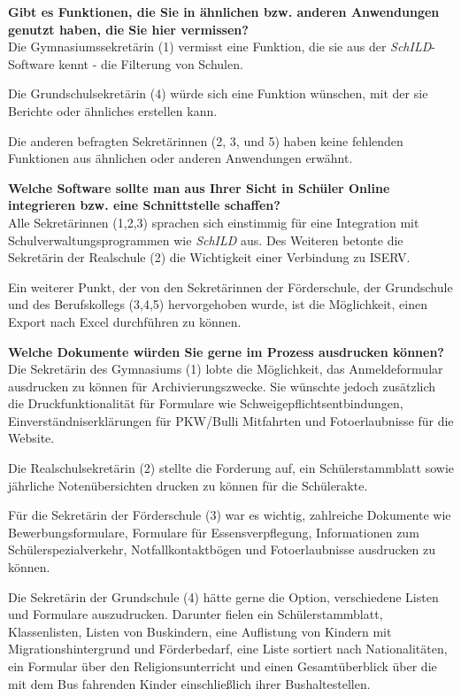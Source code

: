 \textbf{Gibt es Funktionen, die Sie in ähnlichen bzw. anderen Anwendungen genutzt haben, die Sie hier vermissen?}\\
Die Gymnasiumssekretärin (1) vermisst eine Funktion, die sie aus der \textit{SchILD}-Software kennt - die Filterung von Schulen.

Die Grundschulsekretärin (4) würde sich eine Funktion wünschen, mit der sie Berichte oder ähnliches erstellen kann.

Die anderen befragten Sekretärinnen (2, 3, und 5) haben keine fehlenden Funktionen aus ähnlichen oder anderen Anwendungen erwähnt.

\textbf{Welche Software sollte man aus Ihrer Sicht in Schüler Online integrieren bzw. eine Schnittstelle schaffen?}\\
Alle Sekretärinnen (1,2,3) sprachen sich einstimmig für eine Integration mit Schulverwaltungsprogrammen wie \textit{SchILD} aus. Des Weiteren betonte die Sekretärin der Realschule (2) die Wichtigkeit einer Verbindung zu ISERV.

Ein weiterer Punkt, der von den Sekretärinnen der Förderschule, der Grundschule und des Berufskollegs (3,4,5) hervorgehoben wurde, ist die Möglichkeit, einen Export nach Excel durchführen zu können.

\textbf{Welche Dokumente würden Sie gerne im Prozess ausdrucken können?}\\
Die Sekretärin des Gymnasiums (1) lobte die Möglichkeit, das Anmeldeformular ausdrucken zu können für Archivierungszwecke. Sie wünschte jedoch zusätzlich die Druckfunktionalität für Formulare wie Schweigepflichtsentbindungen, Einverständniserklärungen für PKW/Bulli Mitfahrten und Fotoerlaubnisse für die Website.

Die Realschulsekretärin (2) stellte die Forderung auf, ein Schülerstammblatt sowie jährliche Notenübersichten drucken zu können für die Schülerakte.

Für die Sekretärin der Förderschule (3) war es wichtig, zahlreiche Dokumente wie Bewerbungsformulare, Formulare für Essensverpflegung, Informationen zum Schülerspezialverkehr, Notfallkontaktbögen und Fotoerlaubnisse ausdrucken zu können.

Die Sekretärin der Grundschule (4) hätte gerne die Option, verschiedene Listen und Formulare auszudrucken. Darunter fielen ein Schülerstammblatt, Klassenlisten, Listen von Buskindern, eine Auflistung von Kindern mit Migrationshintergrund und Förderbedarf, eine Liste sortiert nach Nationalitäten, ein Formular über den Religionsunterricht und einen Gesamtüberblick über die mit dem Bus fahrenden Kinder einschließlich ihrer Bushaltestellen.

